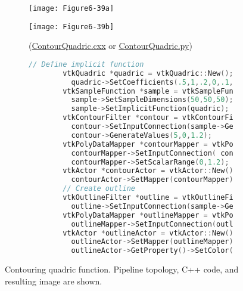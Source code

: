 \begin{figure}[!htb]
	\begin{subfigure}[h]{0.48\linewidth}
		\texttt{[image: Figure6-39a]}
		\caption*{}
		\label{fig:Figure6-39a}
	\end{subfigure}
	\hfill
	\begin{subfigure}[h]{0.48\linewidth}
		\texttt{[image: Figure6-39b]}
		\caption*{(\href{https://lorensen.github.io/VTKExamples/site/Cxx/VisualizationAlgorithms/ContourQuadric/}{ContourQuadric.cxx} or \href{https://lorensen.github.io/VTKExamples/site/Python/VisualizationAlgorithms/ContourQuadric/}{ContourQuadric.py})}
		\label{fig:Figure6-39b}
	\end{subfigure}
	\hfill
	\begin{subfigure}[h]{0.96\linewidth}
		\caption*{}
	\end{subfigure}
	\hfill
	\begin{subfigure}[h]{0.96\linewidth}
		\begin{lstlisting}[language=C++, caption={}]
		// Define implicit function
		vtkQuadric *quadric = vtkQuadric::New();
		  quadric->SetCoefficients(.5,1,.2,0,.1,0,0,.2,0,0);
		vtkSampleFunction *sample = vtkSampleFunction::New();
		  sample->SetSampleDimensions(50,50,50);
		  sample->SetImplicitFunction(quadric);
		vtkContourFilter *contour = vtkContourFilter::New();
		  contour->SetInputConnection(sample->GetOutputPort());
		  contour->GenerateValues(5,0,1.2);
		vtkPolyDataMapper *contourMapper = vtkPolyDataMapper::New();
		  contourMapper->SetInputConnection( contour->GetOutputPort());
		  contourMapper->SetScalarRange(0,1.2);
		vtkActor *contourActor = vtkActor::New();
		  contourActor->SetMapper(contourMapper);
		// Create outline
		vtkOutlineFilter *outline = vtkOutlineFilter::New();
		  outline->SetInputConnection(sample->GetOutputPort());
		vtkPolyDataMapper *outlineMapper = vtkPolyDataMapper::New();
		  outlineMapper->SetInputConnection(outline->GetOutputPort());
		vtkActor *outlineActor = vtkActor::New();
		  outlineActor->SetMapper(outlineMapper);
		  outlineActor->GetProperty()->SetColor(0,0,0);
		\end{lstlisting}
		\caption*{}
		\label{fig:Figure6-39c}
	\end{subfigure}
	\caption{Contouring quadric function. Pipeline topology, C++ code, and resulting image are shown.}\label{fig:Figure6-39}
\end{figure}


